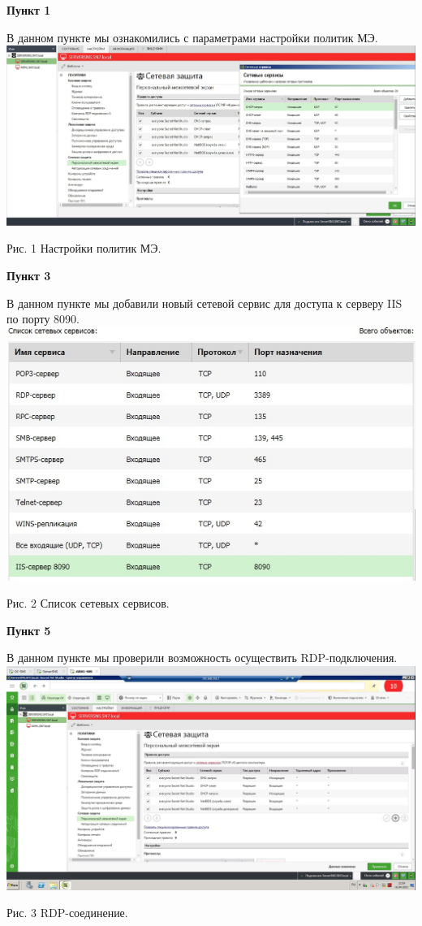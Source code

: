 \documentclass[a4paper,14pt]{extarticle}
\begin{document}
    \textbf{Пункт 1}
    \begin{center}
        В данном пункте мы ознакомились с параметрами настройки политик МЭ.
        \includegraphics[scale=0.3]{pics/1.jpg}

       Рис. 1 Настройки политик МЭ.
    \end{center}

    \textbf{Пункт 3}
    \begin{center}
        В данном пункте мы добавили новый сетевой сервис для доступа к серверу IIS по порту 8090.
        \includegraphics[scale=0.6]{pics/3.jpg}

       Рис. 2 Список сетевых сервисов.
    \end{center}

    \newpage
    \textbf{Пункт 5}
    \begin{center}
        В данном пункте мы проверили возможность осуществить RDP-подключения.
        \includegraphics[scale=0.3]{pics/5.jpg}

        Рис. 3 RDP-соединение.
    \end{center}
\end{document}
